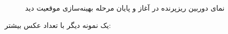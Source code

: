 \begin{figure}[h]
\centering
{}
\hspace*{15mm}

\caption{نمای دوربین ریزپرنده در آغاز و پایان مرحله بهینه‌سازی موقعیت دید}

\label{fig:g1_views}
\end{figure}

یک نمونه دیگر با تعداد عکس بیشتر:

